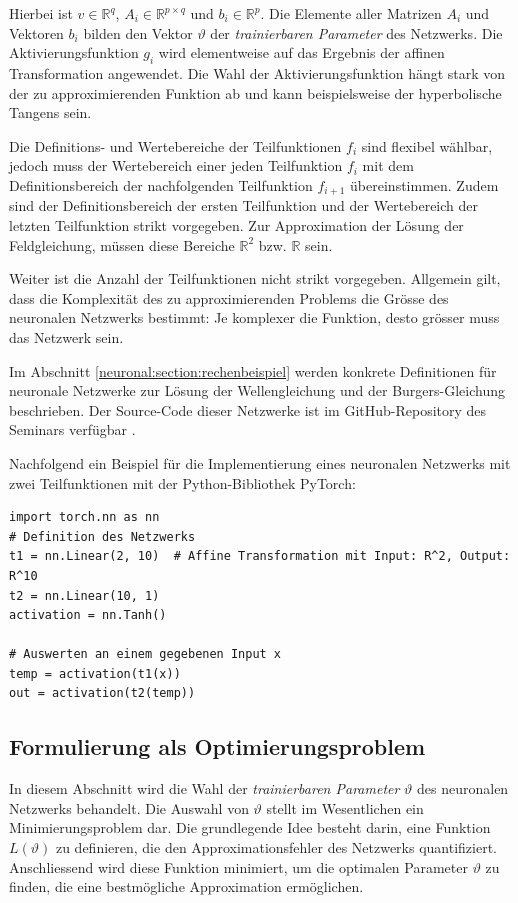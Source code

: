 Hierbei ist \( v \in \mathbb{R}^q \), \( A_i \in \mathbb{R}^{p \times q} \) und \( b_i \in \mathbb{R}^p \). 
Die Elemente aller Matrizen \( A_i \) und Vektoren \( b_i \) bilden den Vektor \( \vartheta \) der \emph{trainierbaren Parameter} des Netzwerks.
Die Aktivierungsfunktion \( g_i \) wird elementweise auf das Ergebnis der affinen Transformation angewendet.
Die Wahl der Aktivierungsfunktion hängt stark von der zu approximierenden Funktion ab und kann beispielsweise der hyperbolische Tangens sein.

Die Definitions- und Wertebereiche der Teilfunktionen \( f_i \) sind flexibel wählbar, jedoch muss der Wertebereich einer jeden Teilfunktion \( f_i \) mit dem Definitionsbereich der nachfolgenden Teilfunktion \( f_{i+1} \) übereinstimmen.
Zudem sind der Definitionsbereich der ersten Teilfunktion und der Wertebereich der letzten Teilfunktion strikt vorgegeben. 
Zur Approximation der Lösung der Feldgleichung, müssen diese Bereiche \( \mathbb{R}^2 \) bzw. \( \mathbb{R} \) sein.

Weiter ist die Anzahl der Teilfunktionen nicht strikt vorgegeben. 
Allgemein gilt, dass die Komplexität des zu approximierenden Problems die Grösse des neuronalen Netzwerks bestimmt: Je komplexer die Funktion, desto grösser muss das Netzwerk sein.

Im Abschnitt \ref{neuronal:section:rechenbeispiel} werden konkrete Definitionen für neuronale Netzwerke zur Lösung der Wellengleichung und der Burgers-Gleichung beschrieben.
Der Source-Code dieser Netzwerke ist im GitHub-Repository des Seminars verfügbar \cite{neuronal:github_source_code}.

Nachfolgend ein Beispiel für die Implementierung eines neuronalen Netzwerks mit zwei Teilfunktionen mit der Python-Bibliothek PyTorch:

\begin{lstlisting}
import torch.nn as nn
# Definition des Netzwerks
t1 = nn.Linear(2, 10)  # Affine Transformation mit Input: R^2, Output: R^10
t2 = nn.Linear(10, 1)
activation = nn.Tanh()

# Auswerten an einem gegebenen Input x
temp = activation(t1(x))
out = activation(t2(temp))
\end{lstlisting}

\subsection{Formulierung als Optimierungsproblem}\label{neuronal:subsection:optimierungsproblem}
In diesem Abschnitt wird die Wahl der \emph{trainierbaren Parameter} $\vartheta$ des neuronalen Netzwerks behandelt.
Die Auswahl von $\vartheta$ stellt im Wesentlichen ein Minimierungsproblem dar.
Die grundlegende Idee besteht darin, eine Funktion \( L(\vartheta) \) zu definieren, die den Approximationsfehler des Netzwerks quantifiziert.
Anschliessend wird diese Funktion minimiert, um die optimalen Parameter $\vartheta$ zu finden, die eine bestmögliche Approximation ermöglichen.

